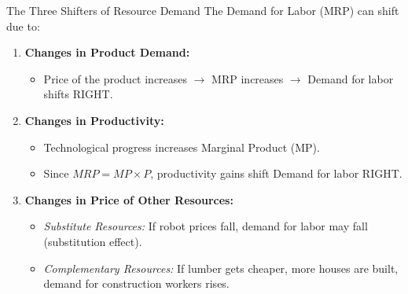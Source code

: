 \documentclass[aspectratio=169]{beamer}
\begin{document}
\begin{frame}{The Three Shifters of Resource Demand}
    The Demand for Labor (MRP) can shift due to:
    
    \begin{enumerate}
        \item \textbf{Changes in Product Demand:}
        \begin{itemize}
            \item Price of the product increases $\rightarrow$ MRP increases $\rightarrow$ Demand for labor shifts RIGHT.
        \end{itemize}
        
        \item \textbf{Changes in Productivity:}
        \begin{itemize}
            \item Technological progress increases Marginal Product (MP).
            \item Since $MRP = MP \times P$, productivity gains shift Demand for labor RIGHT.
        \end{itemize}
        
        \item \textbf{Changes in Price of Other Resources:}
        \begin{itemize}
            \item \textit{Substitute Resources:} If robot prices fall, demand for labor may fall (substitution effect).
            \item \textit{Complementary Resources:} If lumber gets cheaper, more houses are built, demand for construction workers rises.
        \end{itemize}
    \end{enumerate}
\end{frame}
\end{document}
